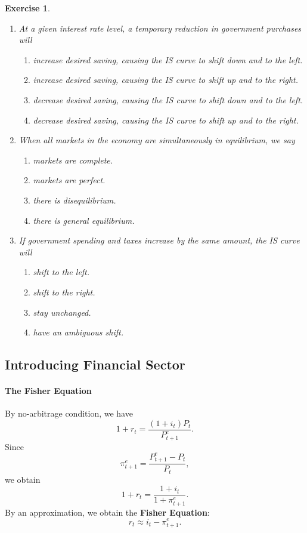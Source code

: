 \documentclass[12pt]{article}
\newtheorem{exercise}{Exercise}
\begin{document}
\begin{exercise}
    \begin{enumerate}[label=(\arabic*)]
        \item At a given interest rate level, a temporary reduction in government purchases will
        \begin{enumerate}[label=\Alph*.]
            \item increase desired saving, causing the IS curve to shift down and to the left.
            \item increase desired saving, causing the IS curve to shift up and to the right.
            \item decrease desired saving, causing the IS curve to shift down and to the left.
            \item decrease desired saving, causing the IS curve to shift up and to the right.
        \end{enumerate}
        \item When all markets in the economy are simultaneously in equilibrium, we say
        \begin{enumerate}[label=\Alph*.]
            \item markets are complete.
            \item markets are perfect.
            \item there is disequilibrium.
            \item there is general equilibrium.
        \end{enumerate}
        \item If government spending and taxes increase by the same amount, the IS curve will
        \begin{enumerate}[label=\Alph*.]
            \item shift to the left.
            \item shift to the right.
            \item stay unchanged.
            \item have an ambiguous shift.
        \end{enumerate}
    \end{enumerate}
\end{exercise}

\subsection*{Introducing Financial Sector}
\paragraph{The Fisher Equation}
By no-arbitrage condition, we have
\[ 1 + r_t = \frac{(1 + i_t) P_t}{P^e_{t+1}}.\]
Since
\[\pi^e_{t+1} = \frac{P^e_{t+1}-P_t}{P_t},\]
we obtain
\[1 + r_t = \frac{1 + i_t}{1 + \pi^e_{t+1}}.\]
By an approximation, we obtain the \textbf{Fisher Equation}:
\[r_t \approx i_t - \pi^e_{t+1}.\]
\end{document}
